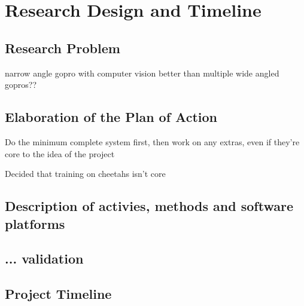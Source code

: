 \section{Research Design and Timeline}
\subsection{Research Problem}
narrow angle gopro with computer vision better than multiple wide angled gopros??
\subsection{Elaboration of the Plan of Action}
Do the minimum complete system first, then work on any extras, even if they're core to the idea of the project

Decided that training on cheetahs isn't core

\subsection{Description of activies, methods and software platforms}
\subsection{... validation}
\subsection{Project Timeline}
